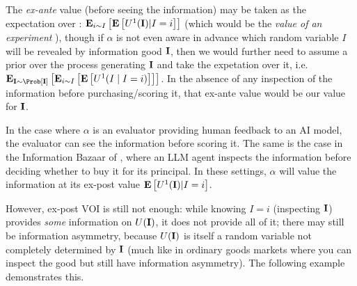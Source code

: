 The \emph{ex-ante} value (before seeing the information) may be taken as the expectation over : $\Expectofu[i\sim I]{\Expectof{U^1(\infogood)|I=i}}$ (which would be the \emph{value of an experiment} ), though if $\alpha$ is not even aware in advance which random variable $I$ will be revealed by information good $\mathbf{I}$, then we would further need to assume a prior over the process generating $\mathbf{I}$ and take the expetation over it, i.e. $\Expectofu[\infogood\sim \Probof{\infogood}]{\Expectofu[i\sim I]{\Expectof{U^1(I\mid I=i)}}}$. In the absence of any inspection of the information before purchasing/scoring it, that ex-ante value would be our value for $\mathbf{I}$.

In the case where $\alpha$ is an evaluator providing human feedback to an AI model, the evaluator can see the information before scoring it. The same is the case in the Information Bazaar of , where an LLM agent inspects the information before deciding whether to buy it for its principal. In these settings, $\alpha$ will value the information at its ex-post value $\mathbf{E}\left[U^1(\mathbf{I})|I=i\right]$.



However, ex-post VOI is still not enough: while knowing $I=i$ (inspecting $\mathbf{I}$) provides \emph{some} information on $U(\mathbf{I})$, it does not provide all of it; there may still be information asymmetry, because $U(\mathbf{I})$ is itself a random variable not completely determined by $\mathbf{I}$ (much like in ordinary goods markets where you can inspect the good but still have information asymmetry). The following example demonstrates this.

